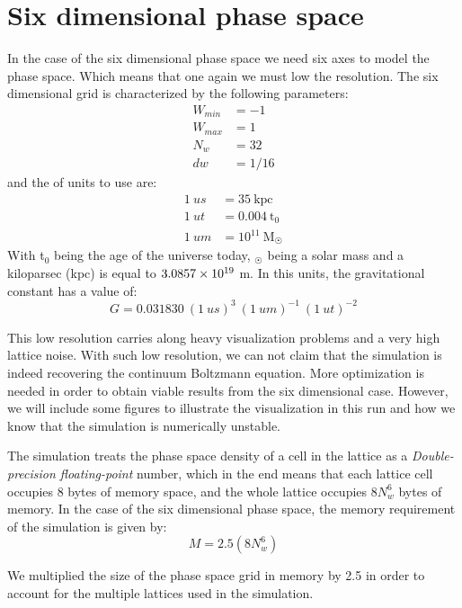 {\section{Six dimensional phase space}
In the case of the six dimensional phase space we need six axes to model the phase space. Which means that one again we must low the resolution. The six dimensional grid is characterized by the following parameters:
\begin{align}
W_{min} &= -1\\
W_{max} &= 1\\
N_w &= 32\\
dw &= 1/16
\end{align}
and the of units to use are:
\begin{align}
1\ us &= 35\ \text{kpc}\\
1\ ut &= 0.004 \ \text{t}_0\\
1\ um &= 10^{11} \ \text{M}_{\astrosun}
\end{align}
With t$_0$ being the age of the universe today, $_{\astrosun}$ being a solar mass and a kiloparsec (kpc) is equal to $3.0857\times 10^{19}$ m. In this units, the gravitational constant has a value of:
\begin{equation}
G = 0.031830 \ (1 \ us)^3 \ (1 \ um)^{-1} \ (1 \ ut)^{-2}
\end{equation}

This low resolution carries along heavy visualization problems and a very high lattice noise. With such low resolution, we can not claim that the simulation is indeed recovering the continuum Boltzmann equation. More optimization is needed in order to obtain viable results from the six dimensional case. However, we will include some figures to illustrate the visualization in this run and how we know that the simulation is numerically unstable.

The simulation treats the phase space density of a cell in the lattice as a \emph{Double-precision floating-point} number, which in the end means that each lattice cell occupies 8 bytes of memory space, and the whole lattice occupies $8N_w^6$ bytes of memory. In the case of the six dimensional phase space, the memory requirement of the simulation is given by:
\begin{equation}
M = 2.5(8N_w^6)
\end{equation}

We multiplied the size of the phase space grid in memory by 2.5 in order to account for the multiple lattices used in the simulation.

}

